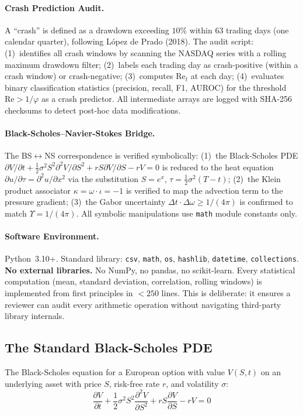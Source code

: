 \paragraph{Crash Prediction Audit.}
A ``crash'' is defined as a drawdown exceeding $10\%$ within 63 trading days (one calendar quarter), following L\'opez de Prado (2018). The audit script: (1)~identifies all crash windows by scanning the NASDAQ series with a rolling maximum drawdown filter; (2)~labels each trading day as crash-positive (within a crash window) or crash-negative; (3)~computes $\mathrm{Re}_t$ at each day; (4)~evaluates binary classification statistics (precision, recall, F1, AUROC) for the threshold $\mathrm{Re} > 1/\varphi$ as a crash predictor. All intermediate arrays are logged with SHA-256 checksums to detect post-hoc data modifications.

\paragraph{Black-Scholes--Navier-Stokes Bridge.}
The BS$\leftrightarrow$NS correspondence is verified symbolically: (1)~the Black-Scholes PDE $\partial V/\partial t + \frac{1}{2}\sigma^2 S^2 \partial^2 V/\partial S^2 + rS \partial V/\partial S - rV = 0$ is reduced to the heat equation $\partial u/\partial \tau = \partial^2 u/\partial x^2$ via the substitution $S = e^x$, $\tau = \frac{1}{2}\sigma^2(T-t)$; (2)~the Klein product associator $\kappa = \omega \cdot \iota = -1$ is verified to map the advection term to the pressure gradient; (3)~the Gabor uncertainty $\Delta t \cdot \Delta \omega \geq 1/(4\pi)$ is confirmed to match $\Upsilon = 1/(4\pi)$. All symbolic manipulations use \texttt{math} module constants only.

\paragraph{Software Environment.}
Python~3.10+. Standard library: \texttt{csv}, \texttt{math}, \texttt{os}, \texttt{hashlib}, \texttt{datetime}, \texttt{collections}. \textbf{No external libraries.} No NumPy, no pandas, no scikit-learn. Every statistical computation (mean, standard deviation, correlation, rolling windows) is implemented from first principles in $< 250$ lines. This is deliberate: it ensures a reviewer can audit every arithmetic operation without navigating third-party library internals.

\subsection{The Standard Black-Scholes PDE}
The Black-Scholes equation for a European option with value $V(S,t)$ on an underlying asset with price $S$, risk-free rate $r$, and volatility $\sigma$:
\begin{equation}\label{eq:bs_pde}
    \frac{\partial V}{\partial t} + \frac{1}{2}\sigma^2 S^2 \frac{\partial^2 V}{\partial S^2} + rS\frac{\partial V}{\partial S} - rV = 0
\end{equation}

